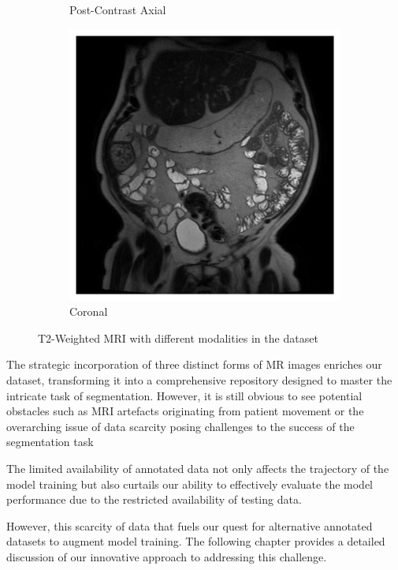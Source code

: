 \begin{figure}[htp]
\begin{subfigure}[b]{0.32\textwidth}
        \caption{Post-Contrast Axial}
        \label{fig:axial-postcon}
    \end{subfigure}
    \hfill
    \begin{subfigure}[b]{0.32\textwidth}
        \centering
        \includegraphics[width=\textwidth]{./figures/coronal.png}
        \caption{Coronal}
        \label{fig:coronal}
    \end{subfigure}
    \caption{T2-Weighted MRI with different modalities in the dataset}
    \label{fig:mri}
\end{figure}

The strategic incorporation of three distinct forms of MR images enriches our dataset, transforming it into a comprehensive repository designed to master the intricate task of segmentation. However, it is still obvious to see potential obstacles such as MRI artefacts originating from patient movement or the overarching issue of data scarcity posing challenges to the success of the segmentation task

The limited availability of annotated data not only affects the trajectory of the model training but also curtails our ability to effectively evaluate the model performance due to the restricted availability of testing data.

However, this scarcity of data that fuels our quest for alternative annotated datasets to augment model training. The following chapter provides a detailed discussion of our innovative approach to addressing this challenge.

